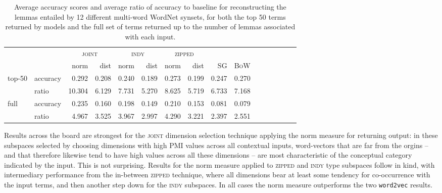 \begin{table}
\centering
\begin{tabular}{llrrrrrrrrrrrr|rr}
\hline
&& \multicolumn{2}{c}{\textsc{joint}} & \multicolumn{2}{c}{\textsc{indy}} & \multicolumn{2}{c}{\textsc{zipped}} & \multicolumn{2}{c}{} \\
&& norm & dist & norm & dist & norm & \multicolumn{1}{r}{dist} & \textsc{SG} & \textsc{BoW} \\
\hline
\multirow{2}{*}{top-50} & accuracy & 0.292 & 0.208 & 0.240 & 0.189 & 0.273 & \multicolumn{1}{r|}{0.199} & 0.247 & 0.270 \\
& ratio & 10.304 & 6.129 & 7.731 & 5.270 & 8.625 & \multicolumn{1}{r|}{5.719} & 6.733 & 7.168 \\
\hline
\multirow{2}{*}{full} & accuracy & 0.235 & 0.160 & 0.198 & 0.149 & 0.210 & \multicolumn{1}{r|}{0.153} & 0.081 & 0.079 \\
& ratio & 4.967 & 3.525 & 3.967 & 2.997 & 4.290 & \multicolumn{1}{r|}{3.221} & 2.397 & 2.551 \\
\hline
\end{tabular}
\caption[Accuracy Scores for WordNet Recapitulation]{Average accuracy scores and average ratio of accuracy to baseline for reconstructing the lemmas entailed by 12 different multi-word WordNet synsets, for both the top 50 terms returned by models and the full set of terms returned up to the number of lemmas associated with each input.}
\label{tab:wordnet}
\end{table}

Results across the board are strongest for the \textsc{joint} dimension selection technique applying the norm measure for returning output: in these subspaces selected by choosing dimensions with high PMI values across all contextual inputs, word-vectors that are far from the orgins -- and that therefore likewise tend to have high values across all these dimensions -- are most characteristic of the conceptual category indicated by the input.  This is not surprising.  Results for the norm measure applied to \textsc{zipped} and \textsc{indy} type subspaces follow in kind, with intermediary performance from the in-between \textsc{zipped} technique, where all dimensions bear at least some tendency for co-occurrence with the input terms, and then another step down for the \textsc{indy} subspaces.  In all cases the norm measure outperforms the two \texttt{word2vec} results.


